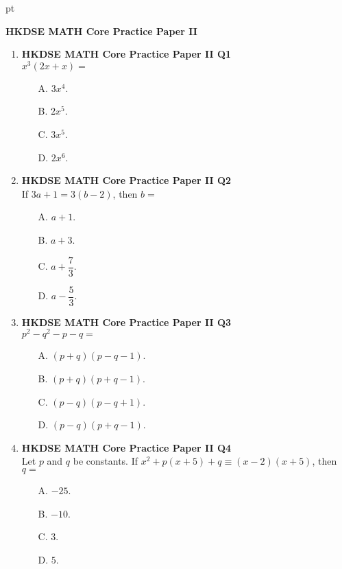 \documentclass[12pt]{article}
\begin{document}
 pt
\begin{center}
	{\large \bf HKDSE MATH Core Practice Paper II}\\
	\vspace{2 mm}
\end{center}
\vspace{0.05cm}

\begin{enumerate}
	\item \textbf{HKDSE MATH Core Practice Paper II Q1}\\
	$x^3(2x + x) = $
	\begin{enumerate}
		\item[A.] $3x^4$.
		\item[B.] $2x^5$.
		\item[C.] $3x^5$.
		\item[D.] $2x^6$.
	\end{enumerate}

	\item \textbf{HKDSE MATH Core Practice Paper II Q2}\\
	If $3a + 1 = 3(b - 2)$, then $b =$
	\begin{enumerate}
		\item[A.] $a + 1$.
		\item[B.] $a + 3$.
		\item[C.] $a + \dfrac{7}{3}$.
		\item[D.] $a - \dfrac{5}{3}$.
	\end{enumerate}

	\item \textbf{HKDSE MATH Core Practice Paper II Q3}\\
	$p^2 - q^2 - p - q =$
	\begin{enumerate}
		\item[A.] $(p + q)(p - q - 1)$.
		\item[B.] $(p + q)(p + q - 1)$.
		\item[C.] $(p - q)(p - q + 1)$.
		\item[D.] $(p - q)(p + q - 1)$.
	\end{enumerate}

	\item \textbf{HKDSE MATH Core Practice Paper II Q4}\\
	Let $p$ and $q$ be constants. If $x^2 + p(x + 5) + q \equiv (x - 2)(x + 5)$, then $q = $
	\begin{enumerate}
		\item[A.] $-25$.
		\item[B.] $-10$.
		\item[C.] $3$.
		\item[D.] $5$.
	\end{enumerate}


\end{enumerate}
\end{document}
